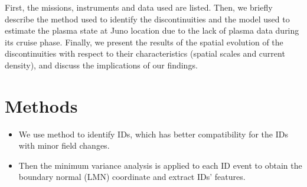 \documentclass[
]{agujournal2019}
\providecommand{\tightlist}{%
  \setlength{\itemsep}{0pt}\setlength{\parskip}{0pt}}\usepackage{longtable,booktabs,array}
\begin{document}
First, the missions, instruments and data used are listed. Then, we brieﬂy describe the method used to identify the discontinuities and the model used to estimate the plasma state at Juno location due to the lack of plasma data during its cruise phase. Finally, we present the results of the spatial evolution of the discontinuities with respect to their characteristics (spatial scales and current density), and discuss the implications of our findings.

\section{Methods}\label{methods}

\begin{itemize}
\tightlist
\item
  We use \citep{liuMagneticDiscontinuitiesSolar2022} method to identify IDs, which has better compatibility for the IDs with minor field changes.
\item
  Then the minimum variance analysis is applied to each ID event to obtain the boundary normal (LMN) coordinate and extract IDs' features.
\end{itemize}
\end{document}
